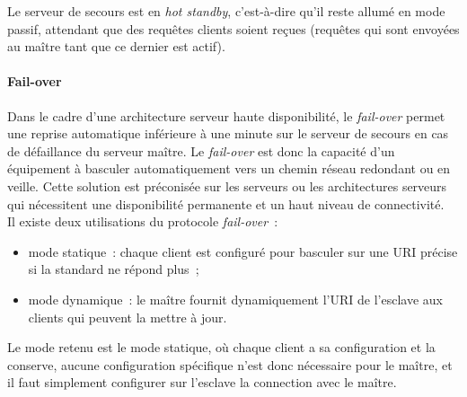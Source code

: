%		
%

Le serveur de secours est en \emph{hot standby}, c'est-à-dire qu'il reste allumé en mode passif, attendant que des requêtes clients soient reçues (requêtes qui sont envoyées au maître tant que ce dernier est actif).

\paragraph{Fail-over}
Dans le cadre d'une architecture serveur haute disponibilité, le \emph{fail-over} permet une reprise automatique inférieure à une minute sur le serveur de secours en cas de défaillance du serveur maître. Le \emph{fail-over} est donc la capacité d'un équipement à basculer automatiquement vers un chemin réseau redondant ou en veille.
Cette solution est préconisée sur les serveurs ou les architectures serveurs qui nécessitent une disponibilité permanente et un haut niveau de connectivité.
\\
Il existe deux utilisations du protocole \emph{fail-over}~:
\begin{itemize}
	\item mode statique~: chaque client est configuré pour basculer sur une URI précise si la standard ne répond plus~;
	\item mode dynamique~: le maître fournit dynamiquement l'URI de l'esclave aux clients qui peuvent la mettre à jour.
\end{itemize}
Le mode retenu est le mode statique, où chaque client a sa configuration et la conserve, aucune configuration spécifique n'est donc nécessaire pour le maître, et il faut simplement configurer sur l'esclave la connection avec le maître.

